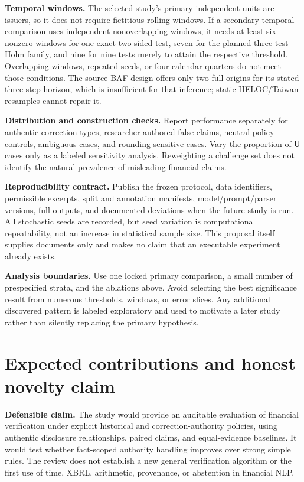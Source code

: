 \documentclass[11pt,a4paper]{article}
\newcommand{\pbreak}{\clearpage}
\newcommand{\lead}[1]{\textbf{\color{navy}#1}}
\newcommand{\Ulabel}{\mathsf{U}}
\begin{document}
\lead{Temporal windows.} The selected study's primary independent units are issuers, so it does not require fictitious rolling windows. If a secondary temporal comparison uses independent nonoverlapping windows, it needs at least six nonzero windows for one exact two-sided test, seven for the planned three-test Holm family, and nine for nine tests merely to attain the respective threshold. Overlapping windows, repeated seeds, or four calendar quarters do not meet those conditions. The source BAF design offers only two full origins for its stated three-step horizon, which is insufficient for that inference; static HELOC/Taiwan resamples cannot repair it.

\lead{Distribution and construction checks.} Report performance separately for authentic correction types, researcher-authored false claims, neutral policy controls, ambiguous cases, and rounding-sensitive cases. Vary the proportion of $\Ulabel$ cases only as a labeled sensitivity analysis. Reweighting a challenge set does not identify the natural prevalence of misleading financial claims.

\lead{Reproducibility contract.} Publish the frozen protocol, data identifiers, permissible excerpts, split and annotation manifests, model/prompt/parser versions, full outputs, and documented deviations when the future study is run. All stochastic seeds are recorded, but seed variation is computational repeatability, not an increase in statistical sample size. This proposal itself supplies documents only and makes no claim that an executable experiment already exists.

\lead{Analysis boundaries.} Use one locked primary comparison, a small number of prespecified strata, and the ablations above. Avoid selecting the best significance result from numerous thresholds, windows, or error slices. Any additional discovered pattern is labeled exploratory and used to motivate a later study rather than silently replacing the primary hypothesis.

\pbreak
\section{Expected contributions and honest novelty claim}
\begin{decisionbox}
\lead{Defensible claim.} The study would provide an auditable evaluation of financial verification under explicit historical and correction-authority policies, using authentic disclosure relationships, paired claims, and equal-evidence baselines. It would test whether fact-scoped authority handling improves over strong simple rules. The review does not establish a new general verification algorithm or the first use of time, XBRL, arithmetic, provenance, or abstention in financial NLP.
\end{decisionbox}
\end{document}
